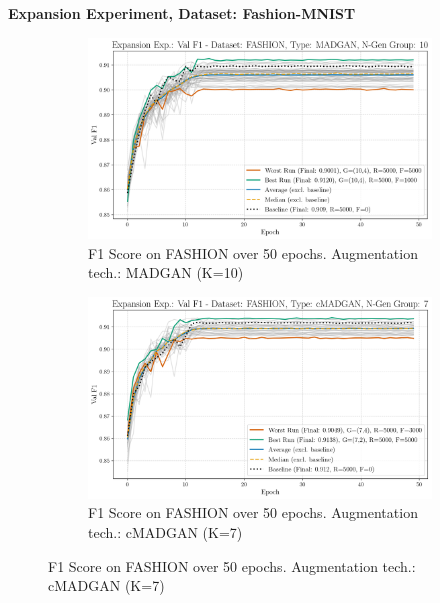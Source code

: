 \newpage
\noindent\textbf{Expansion Experiment, Dataset: Fashion-MNIST}
\begin{figure}[H]
	\centering
	\begin{subfigure}{.85\textwidth}
		\includegraphics[width=\textwidth]{abb/strat_classifier_performance/FASHION_STRATIFIED_CLASSIFIERS_MADGAN_NEW/expansion_experiments/val_f1_score_MADGAN_FASHION_n_gen_10_all.png}
		\caption{F1 Score on FASHION over 50 epochs. Augmentation tech.: MADGAN (K=10)}
        \label{fig:res_expansion_fashion_cmadgan_vs_madgan__madgan}
	\end{subfigure}
	\begin{subfigure}{.85\textwidth}
		\includegraphics[width=\textwidth]{abb/strat_classifier_performance/FASHION_STRATIFIED_CLASSIFIERS_cMADGAN_NEW/expansion_experiments/val_f1_score_cMADGAN_FASHION_n_gen_7_all.png}
		\caption{F1 Score on FASHION over 50 epochs. Augmentation tech.: cMADGAN (K=7)}
        \label{fig:res_expansion_fashion_cmadgan_vs_madgan__cmadgan}
	\end{subfigure}
\end{figure}

